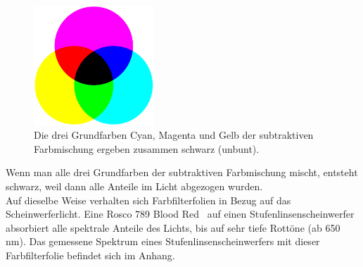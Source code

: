 \begin{figure}[H]     %
\centering
\includegraphics[width=0.4\textwidth]{bilder/farben-} 
\caption {Die drei Grundfarben Cyan, Magenta und Gelb der subtraktiven Farbmischung ergeben zusammen schwarz (unbunt)\protect\footnotemark .}\label{b_farben-}
\end{figure}


\noindent Wenn man alle drei Grundfarben der subtraktiven Farbmischung mischt, entsteht schwarz, weil dann alle Anteile im Licht abgezogen wurden.\\
Auf dieselbe Weise verhalten sich Farbfilterfolien in Bezug auf das Scheinwerferlicht. Eine Rosco 789 \glqq Blood Red \grqq\ auf einen Stufenlinsenscheinwerfer absorbiert alle spektrale Anteile des Lichts, bis auf sehr tiefe Rottöne (ab 650 nm). Das gemessene Spektrum eines Stufenlinsenscheinwerfers mit dieser Farbfilterfolie befindet sich im Anhang.


